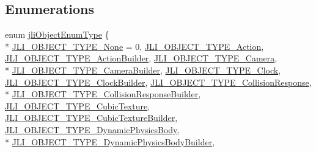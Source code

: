 \subsection*{Enumerations}
\begin{DoxyCompactItemize}
\item 
enum \hyperlink{namespacejli_a11168ac254095f4ba73667ab33713b4f}{jli\+Object\+Enum\+Type} \{ \\*
\hyperlink{namespacejli_a11168ac254095f4ba73667ab33713b4fa64ba672259a65760b4ed49210521871f}{J\+L\+I\+\_\+\+O\+B\+J\+E\+C\+T\+\_\+\+T\+Y\+P\+E\+\_\+\+None} = 0, 
\hyperlink{namespacejli_a11168ac254095f4ba73667ab33713b4fa5d0124db06eb42f1bafeccf49a1df93a}{J\+L\+I\+\_\+\+O\+B\+J\+E\+C\+T\+\_\+\+T\+Y\+P\+E\+\_\+\+Action}, 
\hyperlink{namespacejli_a11168ac254095f4ba73667ab33713b4faf208272c41069b136b609b23e76d0653}{J\+L\+I\+\_\+\+O\+B\+J\+E\+C\+T\+\_\+\+T\+Y\+P\+E\+\_\+\+Action\+Builder}, 
\hyperlink{namespacejli_a11168ac254095f4ba73667ab33713b4fa6c336730aae3537f2f0e7fac0fe72de2}{J\+L\+I\+\_\+\+O\+B\+J\+E\+C\+T\+\_\+\+T\+Y\+P\+E\+\_\+\+Camera}, 
\\*
\hyperlink{namespacejli_a11168ac254095f4ba73667ab33713b4fa43c1c8354d86ce8b7b77b0557614caf1}{J\+L\+I\+\_\+\+O\+B\+J\+E\+C\+T\+\_\+\+T\+Y\+P\+E\+\_\+\+Camera\+Builder}, 
\hyperlink{namespacejli_a11168ac254095f4ba73667ab33713b4fa823ab588063f7fbde69b4affd73af75d}{J\+L\+I\+\_\+\+O\+B\+J\+E\+C\+T\+\_\+\+T\+Y\+P\+E\+\_\+\+Clock}, 
\hyperlink{namespacejli_a11168ac254095f4ba73667ab33713b4fa8078eb2cdd6168f3dc68ce380c32bea0}{J\+L\+I\+\_\+\+O\+B\+J\+E\+C\+T\+\_\+\+T\+Y\+P\+E\+\_\+\+Clock\+Builder}, 
\hyperlink{namespacejli_a11168ac254095f4ba73667ab33713b4facfcf5c7958e840c802319c9dc5052e97}{J\+L\+I\+\_\+\+O\+B\+J\+E\+C\+T\+\_\+\+T\+Y\+P\+E\+\_\+\+Collision\+Response}, 
\\*
\hyperlink{namespacejli_a11168ac254095f4ba73667ab33713b4fa7474dc229dd931b205dd5f0d8bb6867f}{J\+L\+I\+\_\+\+O\+B\+J\+E\+C\+T\+\_\+\+T\+Y\+P\+E\+\_\+\+Collision\+Response\+Builder}, 
\hyperlink{namespacejli_a11168ac254095f4ba73667ab33713b4fa8cc481c4c6831e7ffd4e90d663d30cf0}{J\+L\+I\+\_\+\+O\+B\+J\+E\+C\+T\+\_\+\+T\+Y\+P\+E\+\_\+\+Cubic\+Texture}, 
\hyperlink{namespacejli_a11168ac254095f4ba73667ab33713b4fab7852316145c6fbd4a33103ca6fb35a4}{J\+L\+I\+\_\+\+O\+B\+J\+E\+C\+T\+\_\+\+T\+Y\+P\+E\+\_\+\+Cubic\+Texture\+Builder}, 
\hyperlink{namespacejli_a11168ac254095f4ba73667ab33713b4fac54aa115e63cf54aea508ae3f13e540b}{J\+L\+I\+\_\+\+O\+B\+J\+E\+C\+T\+\_\+\+T\+Y\+P\+E\+\_\+\+Dynamic\+Physics\+Body}, 
\\*
\hyperlink{namespacejli_a11168ac254095f4ba73667ab33713b4fa8bf394969215d0e51d36216fd3e46ceb}{J\+L\+I\+\_\+\+O\+B\+J\+E\+C\+T\+\_\+\+T\+Y\+P\+E\+\_\+\+Dynamic\+Physics\+Body\+Builder}, 

\end{DoxyCompactItemize}
